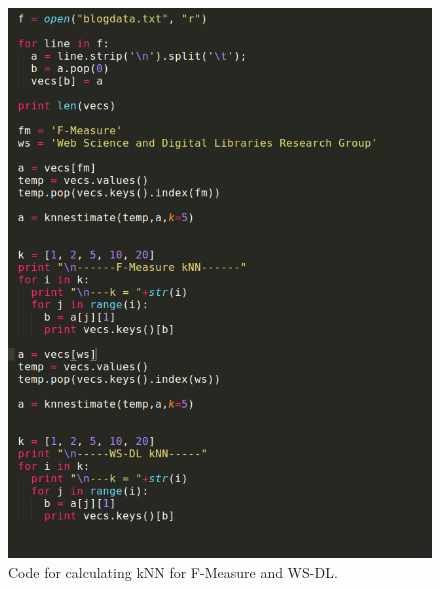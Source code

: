 \documentclass{article}
\begin{document}
\begin{figure}[H]
 \centering
 \includegraphics[width=14 cm]{code.png}
  \caption{Code for calculating kNN for F-Measure and WS-DL.}
\end{figure}
\end{document}
